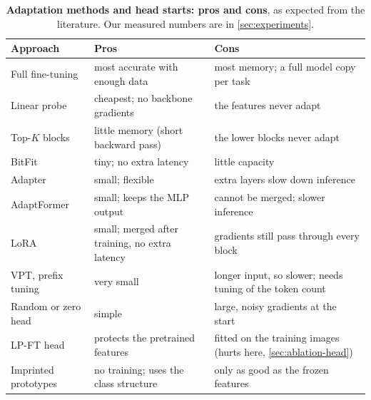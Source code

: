 \begin{table}[t]
  \caption{\textbf{Adaptation methods and head starts: pros and cons}, as expected from the literature. Our measured numbers are in \cref{sec:experiments}.}
  \label{tab:related}
  \centering
  \footnotesize
  \setlength{\tabcolsep}{4pt}
  \begin{tabularx}{\linewidth}{@{}l>{\raggedright}X>{\raggedright\arraybackslash}X@{}}
    \toprule
    Approach & Pros & Cons \\
    \midrule
    Full fine-tuning & most accurate with enough data & most memory; a full model copy per task \\
    Linear probe & cheapest; no backbone gradients & the features never adapt \\
    Top-$K$ blocks & little memory (short backward pass) & the lower blocks never adapt \\
    BitFit & tiny; no extra latency & little capacity \\
    Adapter & small; flexible & extra layers slow down inference \\
    AdaptFormer & small; keeps the MLP output & cannot be merged; slower inference \\
    LoRA & small; merged after training, no extra latency & gradients still pass through every block \\
    VPT, prefix tuning & very small & longer input, so slower; needs tuning of the token count \\
    \midrule
    Random or zero head & simple & large, noisy gradients at the start \\
    LP-FT head & protects the pretrained features & fitted on the training images (hurts here, \cref{sec:ablation-head}) \\
    Imprinted prototypes & no training; uses the class structure & only as good as the frozen features \\
    \bottomrule
  \end{tabularx}
\end{table}
